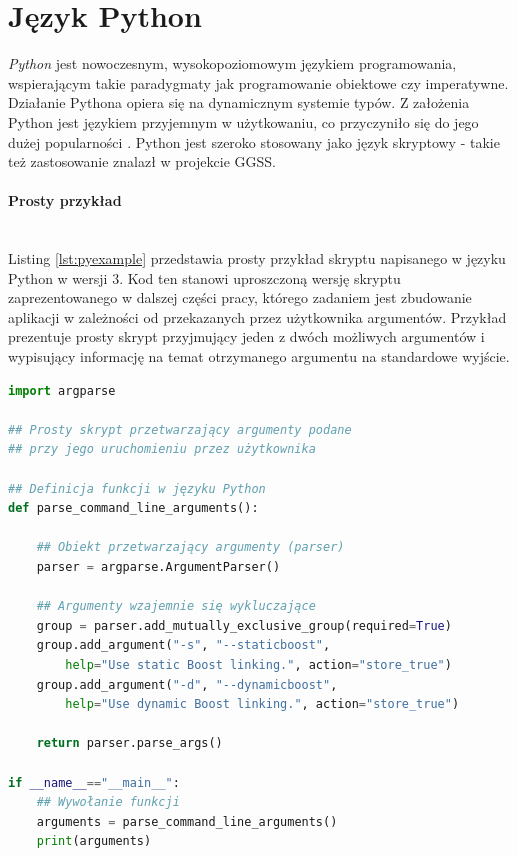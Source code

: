 \section{Język Python}
\textit{Python} jest nowoczesnym, wysokopoziomowym językiem programowania, wspierającym takie paradygmaty jak programowanie obiektowe czy imperatywne. Działanie Pythona opiera się na dynamicznym systemie typów. Z założenia Python jest językiem przyjemnym w użytkowaniu, co przyczyniło się do jego dużej popularności \cite{Lutz}. Python jest szeroko stosowany jako język skryptowy - takie też zastosowanie znalazł w projekcie GGSS.

\paragraph*{Prosty przykład}\mbox{} \\
Listing \ref{lst:pyexample} przedstawia prosty przykład skryptu napisanego w języku Python w wersji 3. Kod ten stanowi uproszczoną wersję skryptu zaprezentowanego w dalszej części pracy, którego zadaniem jest zbudowanie aplikacji w zależności od przekazanych przez użytkownika argumentów. Przykład prezentuje prosty skrypt przyjmujący jeden z dwóch możliwych argumentów i wypisujący informację na temat otrzymanego argumentu na standardowe wyjście.

\begin{lstlisting}[language=python,caption={Przykład prostego skryptu napisanego w języku Python 3 - przetwarzanie argumentów podanych przez użytkownika do skryptu}, label={lst:pyexample}]
import argparse

## Prosty skrypt przetwarzający argumenty podane 
## przy jego uruchomieniu przez użytkownika

## Definicja funkcji w języku Python
def parse_command_line_arguments():

    ## Obiekt przetwarzający argumenty (parser)
    parser = argparse.ArgumentParser()

    ## Argumenty wzajemnie się wykluczające
    group = parser.add_mutually_exclusive_group(required=True)
    group.add_argument("-s", "--staticboost", 
        help="Use static Boost linking.", action="store_true")
    group.add_argument("-d", "--dynamicboost",
        help="Use dynamic Boost linking.", action="store_true")

    return parser.parse_args()

if __name__=="__main__":
    ## Wywołanie funkcji
    arguments = parse_command_line_arguments()
    print(arguments)


\end{lstlisting}

